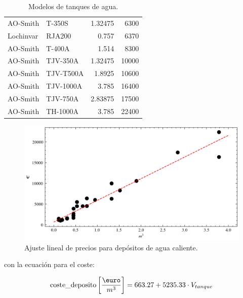 \begin{table}[htbp]
\begin{tabular}{llrr}
		AO-Smith       & T-350S    & 1.32475         & 6300           \\
		Lochinvar      & RJA200    & 0.757           & 6370           \\
		AO-Smith       & T-400A    & 1.514           & 8300           \\
		AO-Smith       & TJV-350A  & 1.32475         & 10000          \\
		AO-Smith       & TJV-T500A & 1.8925          & 10600          \\
		AO-Smith       & TJV-1000A & 3.785           & 16400          \\
		AO-Smith       & TJV-750A  & 2.83875         & 17500          \\
		AO-Smith       & TH-1000A  & 3.785           & 22400          \\
		\bottomrule
	\end{tabular}
	\caption{Modelos de tanques de agua.}
	\label{tab:tank_data}
\end{table}


\begin{figure}[h] \centering
	\centering
	\includegraphics[width=1\textwidth]{./capitulos/adquisicion_de_datos/images/tank_regression.png}
	\caption{Ajuste lineal de precios para depósitos de agua caliente.}
	\label{fig:tank_regression}
\end{figure}

con la ecuación para el coste:

\begin{equation}
	\text{coste\_deposito} \left[\frac{\text{\euro}}{m^3}\right] = 663.27 + 5235.33 \cdot V_{tanque}
\end{equation}
